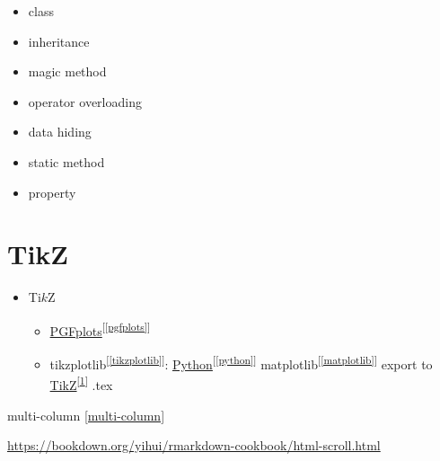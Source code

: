 \documentclass[
]{book}
\newenvironment{Shaded}{\begin{snugshade}}{\end{snugshade}}
\newcommand{\AttributeTok}[1]{\textcolor[rgb]{0.13,0.29,0.53}{#1}}
\newcommand{\FunctionTok}[1]{\textcolor[rgb]{0.13,0.29,0.53}{\textbf{#1}}}
\newcommand{\NormalTok}[1]{#1}
\newcommand{\SpecialCharTok}[1]{\textcolor[rgb]{0.81,0.36,0.00}{\textbf{#1}}}
\newcommand{\StringTok}[1]{\textcolor[rgb]{0.31,0.60,0.02}{#1}}
\providecommand{\tightlist}{%
  \setlength{\itemsep}{0pt}\setlength{\parskip}{0pt}}
\theoremstyle{definition}
\theoremstyle{definition}
\theoremstyle{definition}
\theoremstyle{definition}
\theoremstyle{remark}
\begin{document}
\begin{itemize}
\tightlist
\item
  class
\item
  inheritance
\item
  magic method
\item
  operator overloading
\item
  data hiding
\item
  static method
\item
  property
\end{itemize}

\chapter{TikZ}\label{tikz}

\begin{itemize}
\tightlist
\item
  Ti\(k\)Z

  \begin{itemize}
  \tightlist
  \item
    \hyperref[pgfplots]{PGFplots}\textsuperscript{{[}\ref{pgfplots}{]}}
  \item
    tikzplotlib\textsuperscript{{[}\ref{tikzplotlib}{]}}: \hyperref[python]{Python}\textsuperscript{{[}\ref{python}{]}} matplotlib\textsuperscript{{[}\ref{matplotlib}{]}} export to \hyperref[tikz]{TikZ}\textsuperscript{{[}\ref{tikz}{]}} .tex
  \end{itemize}
\end{itemize}

multi-column \ref{multi-column}

\begin{Shaded}
\end{Shaded}

\url{https://bookdown.org/yihui/rmarkdown-cookbook/html-scroll.html}
\end{document}
